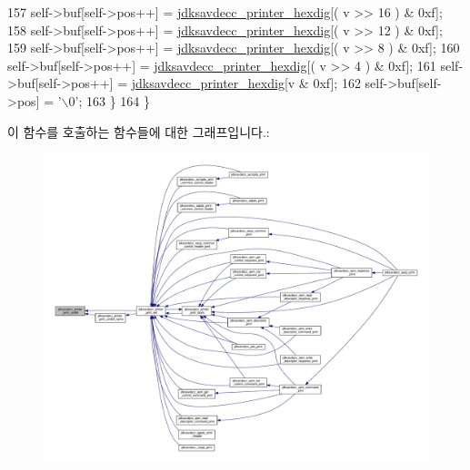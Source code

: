 \begin{DoxyCode}
157         \textcolor{keyword}{self}->buf[\textcolor{keyword}{self}->pos++] = \hyperlink{jdksavdecc__print_8c_ad23c15dfac839a83ff16748e1737ba80}{jdksavdecc\_printer\_hexdig}[( v >> 16 ) & 0xf];
158         \textcolor{keyword}{self}->buf[\textcolor{keyword}{self}->pos++] = \hyperlink{jdksavdecc__print_8c_ad23c15dfac839a83ff16748e1737ba80}{jdksavdecc\_printer\_hexdig}[( v >> 12 ) & 0xf];
159         \textcolor{keyword}{self}->buf[\textcolor{keyword}{self}->pos++] = \hyperlink{jdksavdecc__print_8c_ad23c15dfac839a83ff16748e1737ba80}{jdksavdecc\_printer\_hexdig}[( v >> 8 ) & 0xf];
160         \textcolor{keyword}{self}->buf[\textcolor{keyword}{self}->pos++] = \hyperlink{jdksavdecc__print_8c_ad23c15dfac839a83ff16748e1737ba80}{jdksavdecc\_printer\_hexdig}[( v >> 4 ) & 0xf];
161         \textcolor{keyword}{self}->buf[\textcolor{keyword}{self}->pos++] = \hyperlink{jdksavdecc__print_8c_ad23c15dfac839a83ff16748e1737ba80}{jdksavdecc\_printer\_hexdig}[v & 0xf];
162         \textcolor{keyword}{self}->buf[\textcolor{keyword}{self}->pos] = \textcolor{charliteral}{'\(\backslash\)0'};
163     \}
164 \}
\end{DoxyCode}


이 함수를 호출하는 함수들에 대한 그래프입니다.\+:
\nopagebreak
\begin{figure}[H]
\begin{center}
\leavevmode
\includegraphics[width=350pt]{group__util_ga58db4ed1324866d6b90ba8d0cc854251_icgraph}
\end{center}
\end{figure}


